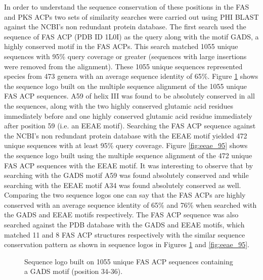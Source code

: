 	In order to understand the sequence conservation of these positions in the FAS and PKS ACPs two sets of similarity searches were carried out using PHI BLAST against the NCBI's non redundant protein database. The first search used the sequence of FAS ACP (PDB ID 1L0I) as the query along with the motif GADS, a highly conserved motif in the FAS ACPs. This search matched 1055 unique sequences with 95\% query coverage or greater (sequences with large insertions were removed from the alignment). These 1055 unique sequences represented species from 473 genera with an average sequence identity of 65\%.  Figure \ref{fig:gads_95} shows the sequence logo built on the multiple sequence alignment of the 1055 unique FAS ACP sequences. A59 of helix III was found to be absolutely conserved in all the sequences, along with the two highly conserved glutamic acid residues immediately before and one highly conserved glutamic acid residue immediately after position 59 (i.e. an EEAE motif). Searching the FAS ACP sequence against the NCBI's non redundant protein database with the EEAE motif yielded 472 unique sequences with at least 95\% query coverage. Figure \ref{fig:eeae_95} shows the sequence logo built using the multiple sequence alignment of the 472 unique FAS ACP sequences with the EEAE motif. It was interesting to observe that by searching with the GADS motif A59 was found absolutely conserved and while searching with the EEAE motif A34 was found absolutely conserved as well. Comparing the two sequence logos one can say that the FAS ACPs are highly conserved with an average sequence identity of 65\% and 76\% when searched with the GADS and EEAE motifs respectively. The FAS ACP sequence was also searched against the PDB database with the GADS and EEAE motifs, which matched 11 and 8 FAS ACP structures respectively with the similar sequence conservation pattern as shown in sequence logos in Figures \ref{fig:gads_95} and \ref{fig:eeae_95}. 

		\setlength\fboxsep{5pt}
		\setlength\fboxrule{1.5pt}
		\begin{figure}[htbp]
		\centering
		\caption[Sequence logo built on 1055 unique FAS ACP sequences containing a GADS motif.]{Sequence logo built on 1055 unique FAS ACP sequences containing a GADS motif (position 34-36).}
		\label{fig:gads_95}
		\end{figure}	


